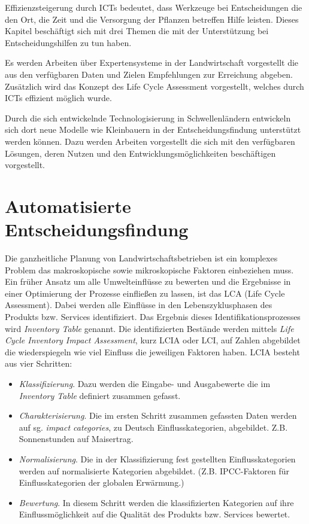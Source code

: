 Effizienzsteigerung durch ICTs bedeutet, dass Werkzeuge bei Entscheidungen die den Ort, die Zeit und die Versorgung der Pflanzen betreffen Hilfe leisten. Dieses Kapitel beschäftigt sich mit drei Themen die mit der Unterstützung bei Entscheidungshilfen zu tun haben.

Es werden Arbeiten über Expertensysteme in der Landwirtschaft vorgestellt die aus den verfügbaren Daten und Zielen Empfehlungen zur Erreichung abgeben. Zusätzlich wird das Konzept des Life Cycle Assessment vorgestellt, welches durch ICTs effizient möglich wurde.

Durch die sich entwickelnde Technologisierung in Schwellenländern entwickeln sich dort neue Modelle wie Kleinbauern in der Entscheidungsfindung unterstützt werden können. Dazu werden Arbeiten vorgestellt die sich mit den verfügbaren Lösungen, deren Nutzen und den Entwicklungsmöglichkeiten beschäftigen vorgestellt.

\section{Automatisierte Entscheidungsfindung}

Die ganzheitliche Planung von Landwirtschaftsbetrieben ist ein komplexes Problem das makroskopische sowie mikroskopische Faktoren einbeziehen muss. Ein früher Ansatz um alle Umwelteinflüsse zu bewerten und die Ergebnisse in einer Optimierung der Prozesse einfließen zu lassen, ist das LCA (Life Cycle Assessment). Dabei werden alle Einflüsse in den Lebenszyklusphasen des Produkts bzw. Services identifiziert. Das Ergebnis dieses Identifikationsprozesses wird \textit{Inventory Table} genannt. Die identifizierten Bestände werden mittels \textit{Life Cycle Inventory Impact Assessment}, kurz LCIA oder LCI, auf Zahlen abgebildet die wiederspiegeln wie viel Einfluss die jeweiligen Faktoren haben. LCIA besteht aus vier Schritten:\cite{jour:Klopffer1997}

\begin{itemize}
	\item \textit{Klassifizierung}. Dazu werden die Eingabe- und Ausgabewerte die im \textit{Inventory Table} definiert zusammen gefasst.
	\item \textit{Charakterisierung}. Die im ersten Schritt zusammen gefassten Daten werden auf sg. \textit{impact categories}, zu Deutsch Einflusskategorien, abgebildet. Z.B. Sonnenstunden auf Maisertrag.
	\item \textit{Normalisierung}. Die in der Klassifizierung fest gestellten Einflusskategorien werden auf normalisierte Kategorien abgebildet. (Z.B. IPCC-Faktoren für Einflusskategorien der globalen Erwärmung.)
	\item \textit{Bewertung}. In diesem Schritt werden die klassifizierten Kategorien auf ihre Einflussmöglichkeit auf die Qualität des Produkts bzw. Services bewertet.
\end{itemize}

